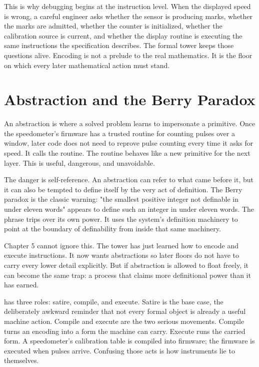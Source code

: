 This is why debugging begins at the instruction level. When the displayed speed
is wrong, a careful engineer asks whether the sensor is producing marks, whether
the marks are admitted, whether the counter is initialized, whether the
calibration source is current, and whether the display routine is executing the
same instructions the specification describes. The formal tower keeps those
questions alive. Encoding is not a prelude to the real mathematics. It is the
floor on which every later mathematical action must stand.

\section{Abstraction and the Berry Paradox}
\label{se:abstraction-berry}

An abstraction is where a solved problem learns to impersonate a primitive.
Once the speedometer's firmware has a trusted routine for counting pulses over
a window, later code does not need to reprove pulse counting every time it
asks for speed. It calls the routine. The routine behaves like a new primitive
for the next layer. This is useful, dangerous, and unavoidable.

The danger is self-reference. An abstraction can refer to what came before it,
but it can also be tempted to define itself by the very act of definition. The
Berry paradox is the classic warning: "the smallest positive integer not
definable in under eleven words" appears to define such an integer in under
eleven words. The phrase trips over its own power. It uses the system's
definition machinery to point at the boundary of definability from inside that
same machinery.

Chapter 5 cannot ignore this. The tower has just learned how to encode and
execute instructions. It now wants abstractions so later floors do not have to
carry every lower detail explicitly. But if abstraction is allowed to float
freely, it can become the same trap: a process that claims more definitional
power than it has earned.

 has three roles: satire, compile, and execute. Satire is
the base case, the deliberately awkward reminder that not every formal object
is already a useful machine action. Compile and execute are the two serious
movements. Compile turns an encoding into a form the machine can carry.
Execute runs the carried form. A speedometer's calibration table is compiled
into firmware; the firmware is executed when pulses arrive. Confusing those
acts is how instruments lie to themselves.

